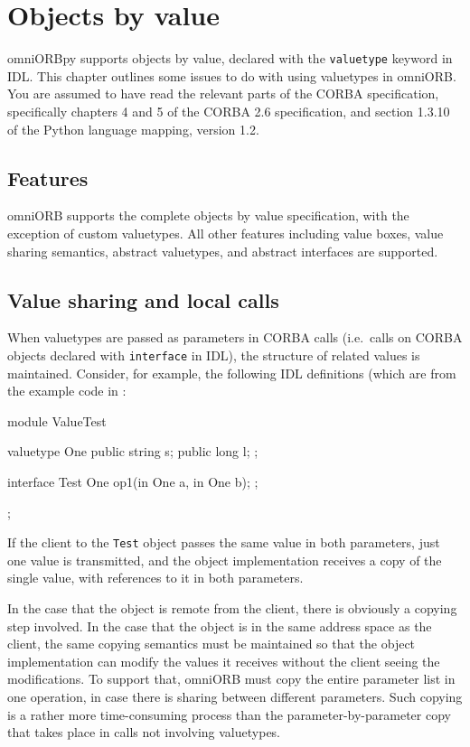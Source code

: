 \documentclass[11pt,oneside,a4paper]{book}
\newcommand{\type}[1]{\texttt{#1}}
\newcommand{\code}[1]{\texttt{#1}}
\begin{document}
\chapter{Objects by value}
\label{chap:valuetype}

omniORBpy supports objects by value, declared with the
\code{valuetype} keyword in IDL. This chapter outlines some issues to
do with using valuetypes in omniORB. You are assumed to have read the
relevant parts of the CORBA specification, specifically chapters 4 and
5 of the CORBA 2.6 specification, and section 1.3.10 of the Python
language mapping, version 1.2.


\section{Features}

omniORB supports the complete objects by value specification, with the
exception of custom valuetypes. All other features including value
boxes, value sharing semantics, abstract valuetypes, and abstract
interfaces are supported.


\section{Value sharing and local calls}

When valuetypes are passed as parameters in CORBA calls (i.e.\ calls
on CORBA objects declared with \code{interface} in IDL), the structure
of related values is maintained. Consider, for example, the following
IDL definitions (which are from the example code in
:

\begin{idllisting}
module ValueTest {
  valuetype One {
    public string s;
    public long   l;
  };

  interface Test {
    One op1(in One a, in One b);
  };
};
\end{idllisting}

If the client to the \type{Test} object passes the same value in both
parameters, just one value is transmitted, and the object
implementation receives a copy of the single value, with references to
it in both parameters.

In the case that the object is remote from the client, there is
obviously a copying step involved. In the case that the object is in
the same address space as the client, the same copying semantics must
be maintained so that the object implementation can modify the values
it receives without the client seeing the modifications. To support
that, omniORB must copy the entire parameter list in one operation, in
case there is sharing between different parameters. Such copying is a
rather more time-consuming process than the parameter-by-parameter
copy that takes place in calls not involving valuetypes.
\end{document}
